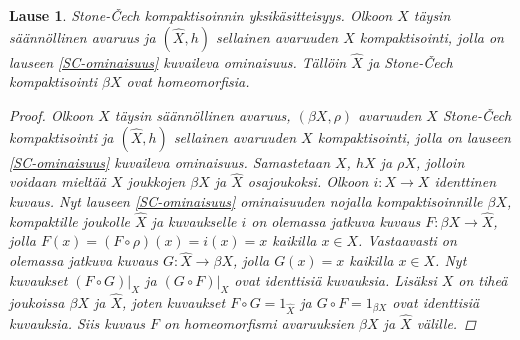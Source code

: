 \documentclass[12pt,a4paper,leqno]{report}
\theoremstyle{plain}
\newtheorem{lause}[equation]{Lause}
\theoremstyle{definition}
\theoremstyle{remark}
\begin{document}
\begin{lause}
Stone-Čech kompaktisoinnin yksikäsitteisyys. 
Olkoon $X$ täysin säännöllinen avaruus 
ja $(\hat{X},h)$ sellainen avaruuden $X$ kompaktisointi, 
jolla on lauseen \ref{SC-ominaisuus} kuvaileva ominaisuus. 
Tällöin $\hat{X} $ ja Stone-Čech kompaktisointi $\beta X$ ovat homeomorfisia. 
\begin{proof}
Olkoon $X$ täysin säännöllinen avaruus, 
$(\beta X,\rho)$ avaruuden $X$ Stone-Čech kompaktisointi 
ja $(\hat{X},h)$ sellainen avaruuden $X$ kompaktisointi, 
jolla on lauseen \ref{SC-ominaisuus} kuvaileva ominaisuus. 
Samastetaan $X$, $hX$ ja $\rho X$, jolloin voidaan mieltää $X$ joukkojen $\beta X$ ja $\hat{X}$ osajoukoksi. 
Olkoon $i\colon X\rightarrow X$ identtinen kuvaus. 
Nyt lauseen \ref{SC-ominaisuus} ominaisuuden nojalla 
kompaktisoinnille $\beta X$, kompaktille joukolle $\hat{X}$ ja kuvaukselle $i$ 
on olemassa jatkuva kuvaus 
$F\colon\beta X\rightarrow \hat{X}$, 
jolla $F(x)=(F\circ\rho)(x)=i(x)=x$ kaikilla $x\in X$. 
Vastaavasti on olemassa jatkuva kuvaus $G\colon \hat{X}\rightarrow \beta X$,
jolla $G(x)=x$ kaikilla $x\in X$. 
Nyt kuvaukset $(F\circ G)\vert_X$ ja $(G\circ F)\vert_X$ ovat 
identtisiä kuvauksia. 
Lisäksi $X$ on tiheä joukoissa $\beta X$ ja $\hat{X}$, joten 
kuvaukset $F\circ G=1_{\hat{X}}$ ja $G\circ F=1_{\beta X}$ ovat identtisiä kuvauksia. 
Siis kuvaus $F$ on homeomorfismi avaruuksien $\beta X$ ja $\hat{X}$ välille.
\end{proof}
\end{lause}
\end{document}
